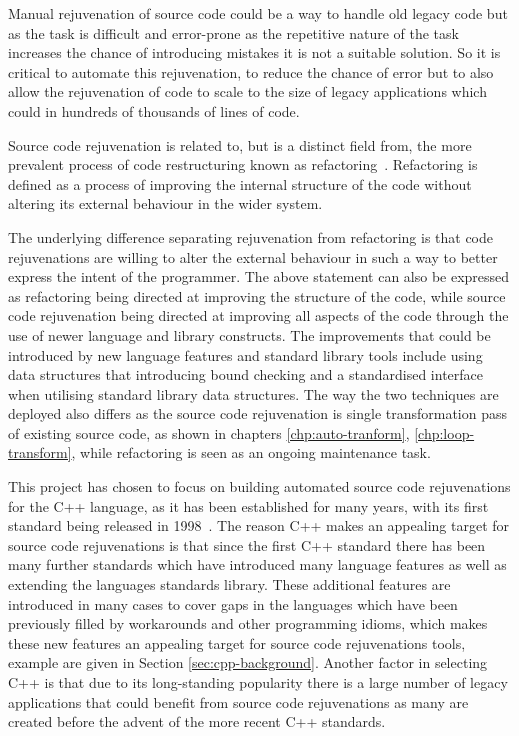 \documentclass[bsc,frontabs,singlespacing,twoside,parskip,deptreport]{infthesis}
\begin{document}
Manual rejuvenation of source code could be a way to handle old legacy code but as the task is difficult and error-prone as the repetitive nature of the task increases the chance of introducing mistakes it is not a suitable solution. So it is critical to automate this rejuvenation, to reduce the chance of error but to also allow the rejuvenation of code to scale to the size of legacy applications which could in hundreds of thousands of lines of code.

Source code rejuvenation is related to, but is a distinct field from, the more prevalent process of code restructuring known as refactoring~\cite{REFACTOR_BOOK}. Refactoring is defined as a process of improving the internal structure of the code without altering its external behaviour in the wider system. 

The underlying difference separating rejuvenation from refactoring is that code rejuvenations are willing to alter the external behaviour in such a way to better express the intent of the programmer. The above statement can also be expressed as refactoring being directed at improving the structure of the code, while source code rejuvenation being directed at improving all aspects of the code through the use of newer language and library constructs. The improvements that could be introduced by new language features and standard library tools include using data structures that introducing bound checking and a standardised interface when utilising standard library data structures. The way the two techniques are deployed also differs as the source code rejuvenation is single transformation pass of existing source code, as shown in chapters \ref{chp:auto-tranform}, \ref{chp:loop-transform}, while refactoring is seen as an ongoing maintenance task.

This project has chosen to focus on building automated source code rejuvenations for the C++ language, as it has been established for many years, with its first standard being released in 1998~\cite{ISO:1998:IIP}. The reason C++ makes an appealing target for source code rejuvenations is that since the first C++ standard there has been many further standards which have introduced many language features as well as extending the languages standards library. These additional features are introduced in many cases to cover gaps in the languages which have been previously filled by workarounds and other programming idioms, which makes these new features an appealing target for source code rejuvenations tools, example are given in Section \ref{sec:cpp-background}. Another factor in selecting C++ is that due to its long-standing popularity there is a large number of legacy applications that could benefit from source code rejuvenations as many are created before the advent of the more recent C++ standards. 
\end{document}
